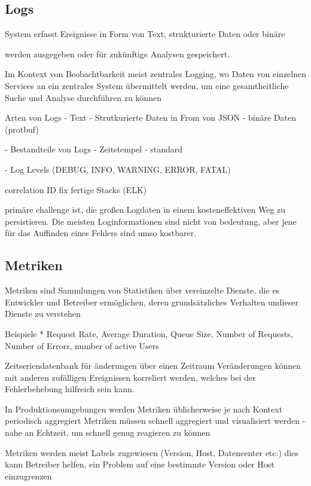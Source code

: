 \documentclass[a4paper,12p]{article}
\begin{document}
\subsection{Logs}

System erfasst Ereignisse in Form von Text, strukturierte Daten oder binäre 

werden ausgegeben oder für zukünftige Analysen gespeichert.

Im Kontext von Beobachtbarkeit meist zentrales Logging, wo Daten von einzelnen Services an ein zentrales System übermittelt werden, um eine gesamtheitliche Suche und Analyse durchführen zu können

Arten von Logs
    - Text
    - Strutkurierte Daten in From von JSON
    - binäre Daten (protbuf)

- Bestandteile von Logs
    - Zeitstempel
    - standard
    
- Log Levels (DEBUG, INFO, WARNING, ERROR, FATAL)

correlation ID
fix fertige Stacks (ELK)

primäre challenge ist, die großen Logdaten in einem kosteneffektiven Weg zu persistieren.
Die meisten Loginformationen sind nicht von bedeutung, aber jene für das Auffinden eines Fehlers sind umso kostbarer.

\subsection{Metriken}

Metriken sind Sammlungen von Statistiken über vereinzelte Dienste, die es Entwickler und Betreiber ermöglichen, deren grundsätzliches Verhalten undieser Dienste zu verstehen

Beispiele
* Request Rate, Average Duration, Queue Size, Number of Requests, Number of Errors, number of active Users

Zeitseriendatenbank für änderungen über einen Zeitraum
Veränderungen können mit anderen zufälligen Ereignissen korreliert werden, welches bei der Fehlerbehebung hilfreich sein kann.

In Produktionsumgebungen werden Metriken üblicherweise je nach Kontext periodisch aggregiert
Metriken müssen schnell aggregiert und visualisiert werden - nahe an Echtzeit, um schnell genug reagieren zu können

Metriken werden meist Labels zugewiesen (Version, Host, Datencenter etc.)
dies kann Betreiber helfen, ein Problem auf eine bestimmte Version oder Host einzugrenzen
\end{document}
